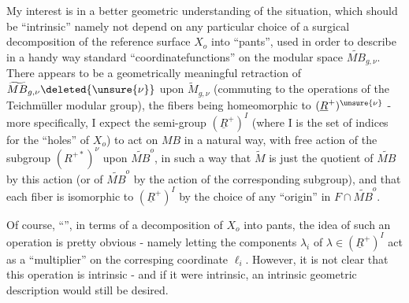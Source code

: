 My interest is in a better geometric understanding of the situation, which should be ``intrinsic'' namely not depend on any particular choice of a surgical decomposition of the reference surface $X_o$ into ``pants'', used in order to describe in a handy way  standard ``coordinatefunctions'' on the modular space $\widetilde{MB}_{g,\nu}$. There appears to be a geometrically meaningful retraction of $\widetilde{MB}_{g,\nu}\deleted{\unsure{\nu}}$ upon $\widetilde M_{g,\nu}$ (commuting to the operations of the Teichmüller modular group), the fibers being homeomorphic to $(\underline R^+)^{\unsure{\nu}}$ - more specifically, I expect the semi-group $(\underline R^+)^I$ (where I is the set of indices for the ``holes'' of $X_o$) to act on $MB$ in a natural way, with free action of the subgroup $(R^{+*})^{\nu}$ upon $\widetilde{MB}^{o}$, in such a way that $\widetilde M$ is just the quotient of $\widetilde{MB}$ by this action (or of $\widetilde{MB}^{o}$ by the action of the  corresponding subgroup), and that each fiber is isomorphic to $(\underline R^+)^I$ by the choice of any ``origin'' in $F\cap\widetilde{MB}^{o}$.

Of course, ``'', in terms of a decomposition of $X_o$ into pants, the idea of such an operation is pretty obvious - namely letting the components $\lambda_i$ of $\lambda\in(\underline R^+)^I$ act as a ``multiplier'' on the corresping coordinate $\ell_i$. However, it is not clear that this operation is intrinsic - and if it were intrinsic, an intrinsic geometric description would still be  desired.

